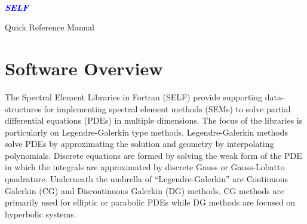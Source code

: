 \documentclass[12pt]{softwaremanual}
\author{Joseph Schoonover}
\title{}
\date{}
\begin{document}
\begin{titlingpage}
    
        \vspace*{2cm}
        
     \begin{flushright}
        {\selectfont
        \\
        }
       
        \vspace{1cm}
        
        \huge{
        \textbf{
        \textit{
        \textcolor{blue}{
           SELF
        }}}}
        
     \end{flushright}
         
        \vspace{2cm}
        
     \begin{center}
     
        {\selectfont
        \huge{
           Quick Reference Manual
        }
        
        \vspace{1.5cm}
        
        \textbf{
        \large{
           \theauthor 
         }}}
        
        \vfill
        
        
        \vspace{0.8cm}
        
     \end{center}
        
    
\end{titlingpage}



\tableofcontents

\pagestyle{myheadings}
\chapter{Software Overview}
The Spectral Element Libraries in Fortran (SELF) provide supporting data-structures for implementing spectral element methods (SEMs) to solve partial differential equations (PDEs) in multiple dimensions. The focus of the libraries is particularly on Legendre-Galerkin type methods. Legendre-Galerkin methods solve PDEs by approximating the solution and geometry by interpolating polynomials. Discrete equations are formed by solving the weak form of the PDE in which the integrals are approximated by discrete Gauss or Gauss-Lobatto quadrature. Underneath the umbrella of ``Legendre-Galerkin'' are Continuous Galerkin (CG) and Discontinuous Galerkin (DG) methods. CG methods are primarily used for elliptic or parabolic PDEs while DG methods are focused on hyperbolic systems.
\end{document}
